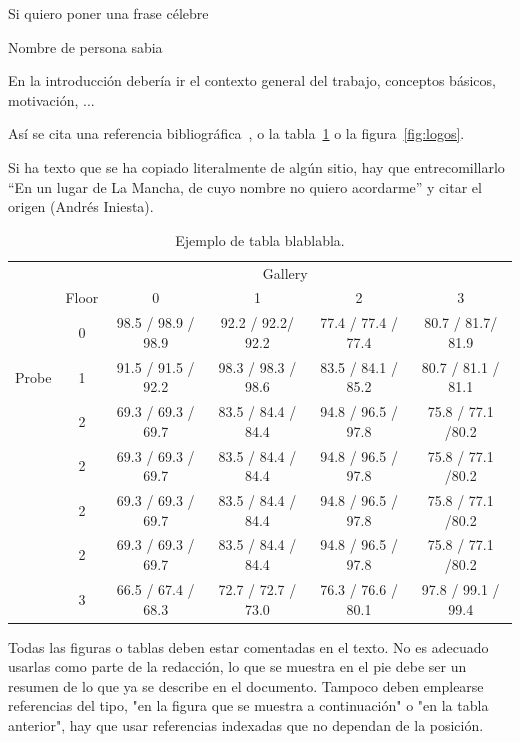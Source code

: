 
\epigraph{Si quiero poner una frase célebre}{Nombre de persona sabia}

En la introducción debería ir el contexto general del trabajo, conceptos básicos, motivación, ...

Así se cita una referencia bibliográfica~\cite{Castrillon11-mva}, o la tabla~\ref{tab:floors} o la figura~\ref{fig:logos}.

Si ha texto que se ha copiado literalmente de algún sitio, hay que entrecomillarlo ``En un lugar de La Mancha, de cuyo nombre no quiero acordarme'' y citar el origen (Andrés Iniesta).

\begin{table}[!htbp]
\caption{Ejemplo de tabla blablabla.}
\label{tab:floors}
\centering
\begin{tabular}{|l|c|c|c|c|c|}
\cline{1-6}
 & \multicolumn{5}{c|}{Gallery} \\ \cline{1-6} 
 & Floor & 0 & 1 & 2 & 3 \\ \cline{2-6} 
 & 0 & 98.5 / 98.9 / 98.9 & 92.2 / 92.2/ 92.2 & 77.4 / 77.4 / 77.4 & 80.7 / 81.7/ 81.9 \\ \cline{2-2}
Probe & 1 & 91.5 / 91.5 / 92.2 & 98.3 / 98.3 / 98.6 & 83.5 / 84.1 / 85.2& 80.7 / 81.1 / 81.1 \\ \cline{2-2}
 & 2 & 69.3 / 69.3 / 69.7 & 83.5 / 84.4 / 84.4 & 94.8 / 96.5 / 97.8 & 75.8 / 77.1 /80.2 \\ \cline{2-2}
 & 2 & 69.3 / 69.3 / 69.7 & 83.5 / 84.4 / 84.4 & 94.8 / 96.5 / 97.8 & 75.8 / 77.1 /80.2 \\ \cline{2-2}
 & 2 & 69.3 / 69.3 / 69.7 & 83.5 / 84.4 / 84.4 & 94.8 / 96.5 / 97.8 & 75.8 / 77.1 /80.2 \\ \cline{2-2}
 & 2 & 69.3 / 69.3 / 69.7 & 83.5 / 84.4 / 84.4 & 94.8 / 96.5 / 97.8 & 75.8 / 77.1 /80.2 \\ \cline{2-2}
 & 3 & 66.5 / 67.4 / 68.3 & 72.7 / 72.7 / 73.0 & 76.3 / 76.6 / 80.1 & 97.8 / 99.1 / 99.4 \\ \cline{1-6}
\end{tabular}
\end{table}

Todas las figuras o tablas deben estar comentadas en el texto. No es adecuado usarlas como parte de la redacción, lo que se muestra en el pie debe ser un resumen de lo que ya se describe en el documento. Tampoco deben emplearse referencias del tipo, "en la figura que se muestra a continuación" o "en la tabla anterior", hay que usar referencias indexadas que no dependan de la posición.

